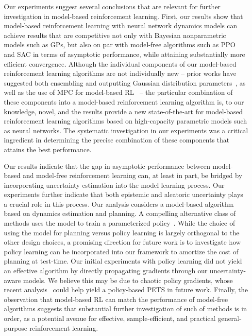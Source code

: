 Our experiments suggest several conclusions that are relevant for further investigation in model-based reinforcement learning. 
First, our results show that model-based reinforcement learning with neural network dynamics models can achieve results that are competitive not only with Bayesian nonparametric models such as GPs, but also on par with model-free algorithms such as PPO and SAC in terms of asymptotic performance, while attaining substantially more efficient convergence. 
Although the individual components of our model-based reinforcement learning algorithms are not individually new -- prior works have suggested both ensembling and outputting Gaussian distribution parameters~\citep{Lakshminarayanan2017}, as well as the use of MPC for model-based RL~\citep{Nagabandi2017} -- the particular combination of these components into a model-based reinforcement learning algorithm is, to our knowledge, novel, and the results provide a new state-of-the-art for model-based reinforcement learning algorithms based on high-capacity parametric models such as neural networks. The systematic investigation in our experiments was a critical ingredient in determining the precise combination of these components that attains the best performance.

Our results indicate that the gap in asymptotic performance between model-based and model-free reinforcement learning can, at least in part, be bridged by incorporating uncertainty estimation into the model learning process. 
Our experiments further indicate that both epistemic and aleatoric uncertainty plays a crucial role in this process. 
Our analysis considers a model-based algorithm based on dynamics estimation and planning. 
A compelling alternative class of methods uses the model to train a parameterized policy~\citep{Ko2007,Deisenroth2014,McAllister2017}. 
While the choice of using the model for planning versus policy learning is largely orthogonal to the other design choices, a promising direction for future work is to investigate how policy learning can be incorporated into our framework to amortize the cost of planning at test-time. 
Our initial experiments with policy learning did not yield an effective algorithm by directly propagating gradients through our uncertainty-aware models. 
We believe this may be due to chaotic policy gradients, whose recent analysis~\citep{Parmas2018} could help yield a policy-based PETS in future work.
Finally, the observation that model-based RL can match the performance of model-free algorithms suggests that substantial further investigation of such of methods is in order, as a potential avenue for effective, sample-efficient, and practical general-purpose reinforcement learning.

